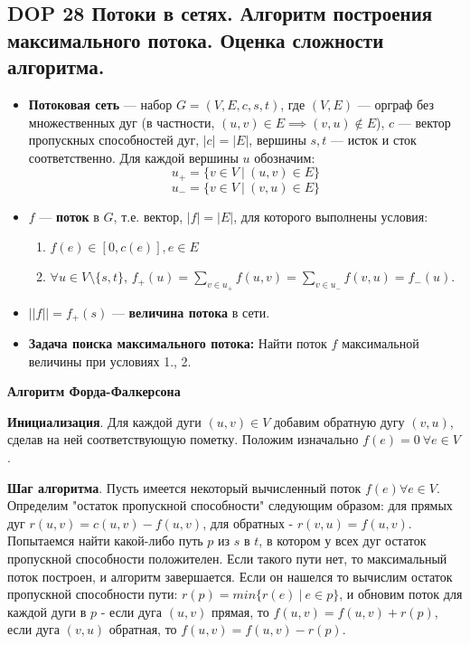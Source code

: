 \subsection{DOP 28 Потоки в сетях. Алгоритм построения максимального потока. Оценка сложности алгоритма.}


\begin{itemize}
    \item \textbf{Потоковая сеть} --- набор $G = (V, E, c, s, t)$, где $(V, E)$ --- орграф без множественных дуг (в частности, $(u,v) \in E \implies (v, u) \notin E$), $c$ --- вектор пропускных способностей дуг, $|c| = |E|$, вершины $s, t$ --- исток и сток соответственно. Для каждой вершины $u$ обозначим:
    $$ u_+ = \{v \in V~|~(u, v) \in E\}$$
    $$u_- = \{v \in V~|~(v, u) \in E\}$$
    \item $f$ --- \textbf{поток} в $G$, т.е. вектор, $|f| = |E|$, для которого выполнены условия:
    \begin{enumerate}
        \item $f(e) \in [0, c(e)], e \in E$
        \item $\forall u \in V \setminus\{s, t\}$, $f_+(u) = \sum_{v \in u_+} f(u, v) = \sum_{v \in u_-} f (v, u) = f_-(u)$.
    \end{enumerate}
    \item $||f|| = f_+(s)$ --- \textbf{величина потока} в сети.
    \item \textbf{Задача поиска максимального потока:}
    Найти поток $f$ максимальной величины при условиях 1., 2.
\end{itemize}

\textbf{Алгоритм Форда-Фалкерсона}

\textbf{Инициализация}.
Для каждой дуги $(u, v) \in V$ добавим обратную дугу $(v, u)$, сделав на ней соответствующую пометку. Положим изначально $f(e) = 0 ~ \forall e \in V$.

\textbf{Шаг алгоритма}.
Пусть имеется некоторый вычисленный поток $f(e) \forall e \in V$. Определим "остаток пропускной способности" следующим образом: для прямых дуг $r(u,v) = c(u,v) - f(u,v)$, для обратных - $r(v,u) = f(u,v)$. Попытаемся найти какой-либо путь $p$ из $s$ в $t$, в котором у всех дуг остаток пропускной способности положителен. Если такого пути нет, то максимальный поток построен, и алгоритм завершается. Если он нашелся то вычислим остаток пропускной способности пути: $r(p) = min\{r(e)~|~e \in p\}$, и обновим поток для каждой дуги в $p$ - если дуга $(u, v)$ прямая, то $f(u, v) = f(u, v) + r(p)$, если дуга $(v, u)$ обратная, то $f(u, v) = f(u, v) - r(p)$. 

